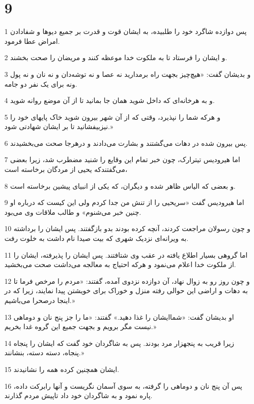 \chapter{9}

\par 1 پس دوازده شاگرد خود را طلبیده، به ایشان قوت و قدرت بر جمیع دیوها و شفادادن امراض عطا فرمود.
\par 2 و ایشان را فرستاد تا به ملکوت خدا موعظه کنند و مریضان را صحت بخشند.
\par 3 و بدیشان گفت: «هیچ‌چیز بجهت راه برمدارید نه عصا و نه توشه‌دان و نه نان و نه پول ونه برای یک نفر دو جامه.
\par 4 و به هرخانه‌ای که داخل شوید همان جا بمانید تا از آن موضع روانه شوید.
\par 5 و هر‌که شما را نپذیرد، وقتی که از آن شهر بیرون شوید خاک پایهای خود را نیزبیفشانید تا بر ایشان شهادتی شود.»
\par 6 پس بیرون شده در دهات می‌گشتند و بشارت می‌دادند و درهرجا صحت می‌بخشیدند.
\par 7 اما هیرودیس تیترارک، چون خبر تمام این وقایع را شنید مضطرب شد، زیرا بعضی می‌گفتندکه یحیی از مردگان برخاسته است،
\par 8 و بعضی که الیاس ظاهر شده و دیگران، که یکی از انبیای پیشین برخاسته است.
\par 9 اما هیرودیس گفت «سریحیی را از تنش من جدا کردم ولی این کیست که درباره او چنین خبر می‌شنوم» و طالب ملاقات وی می‌بود.
\par 10 و چون رسولان مراجعت کردند، آنچه کرده بودند بدو بازگفتند. پس ایشان را برداشته به ویرانه‌ای نزدیک شهری که بیت صیدا نام داشت به خلوت رفت.
\par 11 اما گروهی بسیار اطلاع یافته در عقب وی شتافتند. پس ایشان را پذیرفته، ایشان را از ملکوت خدا اعلام می‌نمود و هر‌که احتیاج به معالجه می‌داشت صحت می‌بخشید.
\par 12 و چون روز رو به زوال نهاد، آن دوازده نزدوی آمده، گفتند: «مردم را مرخص فرما تا به دهات و اراضی این حوالی رفته منزل و خوراک برای خویشتن پیدا نمایند، زیرا که در اینجا درصحرا می‌باشیم.»
\par 13 او بدیشان گفت: «شماایشان را غذا دهید.» گفتند: «ما را جز پنج نان و دوماهی نیست مگر برویم و بجهت جمیع این گروه غدا بخریم.»
\par 14 زیرا قریب به پنجهزار مرد بودند. پس به شاگردان خود گفت که ایشان را پنجاه پنجاه، دسته دسته، بنشانند.»
\par 15 ایشان همچنین کرده همه را نشانیدند.
\par 16 پس آن پنج نان و دوماهی را گرفته، به سوی آسمان نگریست و آنها رابرکت داده، پاره نمود و به شاگردان خود داد تاپیش مردم گذارند.
